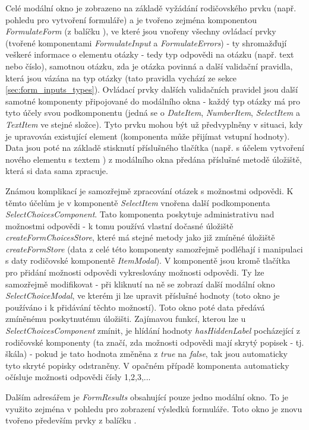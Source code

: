			Celé modální okno je zobrazeno na základě vyžádání rodičovského prvku (např. pohledu pro vytvoření formuláře) a je tvořeno zejména komponentou \textit{FormulateForm} (z balíčku ), ve které jsou vnořeny všechny ovládací prvky (tvořené komponentami \textit{FormulateInput} a \textit{FormulateErrors}) - ty shromažďují veškeré informace o elementu otázky - tedy typ odpovědi na otázku (např. text nebo číslo), samotnou otázku, zda je otázka povinná a další validační pravidla, která jsou vázána na typ otázky (tato pravidla vychází ze sekce \ref{sec:form_inputs_types}). Ovládací prvky dalších validačních pravidel jsou další samotné komponenty připojované do modálního okna - každý typ otázky má pro tyto účely svou podkomponentu (jedná se o \textit{DateItem}, \textit{NumberItem}, \textit{SelectItem} a \textit{TextItem} ve stejné složce). Tyto prvku mohou být už předvyplněny v situaci, kdy je upravován existující element (komponenta může přijímat vstupní hodnoty). Data jsou poté na základě stisknutí příslušného tlačítka (např. s účelem vytvoření nového elementu s textem ) z modálního okna předána příslušné metodě úložiště, která si data sama zpracuje.
			
			Známou komplikací je samozřejmě zpracování otázek s možnostmi odpovědi. K těmto účelům je v komponentě \textit{SelectItem} vnořena další podkomponenta \textit{SelectChoicesComponent}. Tato komponenta poskytuje administrativu nad možnostmi odpovědi - k tomu používá vlastní dočasné úložiště \textit{createFormChoicesStore}, které má stejné metody jako již zmíněné úložiště \textit{createFormStore} (data z celé této komponenty samozřejmě podléhají i manipulaci s daty rodičovské komponentě \textit{ItemModal}). V komponentě jsou kromě tlačítka pro přidání možnosti odpovědi vykreslovány možnosti odpovědi. Ty lze samozřejmě modifikovat - při kliknutí na ně se zobrazí další modální okno \textit{SelectChoiceModal}, ve kterém ji lze upravit příslušné hodnoty (toto okno je používáno i k přidávání těchto možností). Toto okno poté data předává zmíněnému poskytnutému úložišti. Zajímavou funkcí, kterou lze u \textit{SelectChoicesComponent} zmínit, je hlídání hodnoty \textit{hasHiddenLabel} pocházející z rodičovské komponenty (ta značí, zda možnosti odpovědi mají skrytý popisek - tj. škála) - pokud je tato hodnota změněna z \textit{true} na \textit{false}, tak jsou automaticky tyto skryté popisky odstraněny. V opačném případě komponenta automaticky očísluje možnosti odpovědi čísly 1,2,3,...
			
			Dalším adresářem je \textit{FormResults} obsahující pouze jedno modální okno. To je využito zejména v pohledu pro zobrazení výsledků formuláře. Toto okno je znovu tvořeno především prvky z balíčku . 
			
